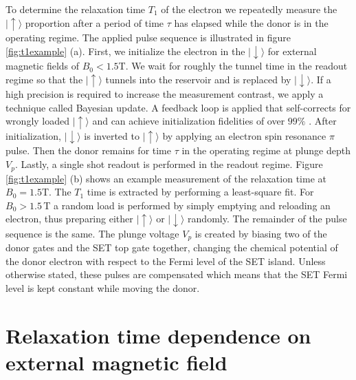 \documentclass[%
 reprint,
 amsmath,amssymb,
 aps,
]{revtex4-1}
\newcommand {\ket} [1] {|{ #1 \rangle}}
\begin{document}
To determine the relaxation time $T_1$ of the electron we repeatedly measure the $\ket{\uparrow}$ proportion after a period of time $\tau$ has elapsed while the donor is in the operating regime.  The applied pulse sequence is illustrated in figure \ref{fig:t1example} (a). First, we initialize the electron in the $\ket{\downarrow}$ for external magnetic fields of $B_0<1.5$T. We wait for roughly the tunnel time in the readout regime so that the $\ket{\uparrow}$ tunnels into the reservoir and is replaced by $\ket{\downarrow}$. If a high precision is required to increase the measurement contrast, we apply a technique called Bayesian update. A feedback loop is applied that self-corrects for wrongly loaded $\ket{\uparrow}$ and can achieve initialization fidelities of over $99\%$ \citep{Johnson2018}. After initialization, $\ket{\downarrow}$ is inverted to $\ket{\uparrow}$ by applying an electron spin resonance $\pi$ pulse. Then the donor remains for time $\tau$ in the operating regime at plunge depth $V_{p}$. Lastly, a single shot readout is performed in the readout regime. Figure \ref{fig:t1example} (b) shows an example measurement of the relaxation time at $B_0=1.5$T. The $T_1$ time is extracted by performing a least-square fit. For $B_0>1.5\,$T a random load is performed by simply emptying and reloading an electron, thus preparing either $\ket{\uparrow}$ or $\ket{\downarrow}$ randomly. The remainder of the pulse sequence is the same. The plunge voltage $V_p$ is created by biasing two of the donor gates and the SET top gate together, changing the chemical potential of the donor electron with respect to the Fermi level of the SET island. Unless otherwise stated, these pulses are compensated which means that the SET Fermi level is kept constant while moving the donor. 



\section{\label{sec:extB}Relaxation time dependence on external magnetic field}
\end{document}
